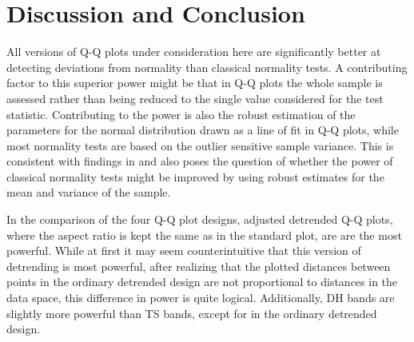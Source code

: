 \documentclass[12pt]{article}\usepackage[]{graphicx}\usepackage[]{color}
\begin{document}
\section{Discussion and Conclusion}\label{sec:discussion}

All versions of Q-Q plots under consideration here are significantly better at detecting deviations from normality than classical normality tests. A contributing factor to this superior power might be  that in  Q-Q plots the whole sample is assessed rather than being reduced to the single value considered for the test statistic. 
Contributing to the power is also the robust estimation of the parameters for the normal distribution drawn as a line of fit in  Q-Q plots, while most normality tests are based on the outlier sensitive sample variance. %
This is consistent with findings in \citet{buja:2013} and  also poses the question of whether the power of classical normality tests might  be improved by using robust estimates for the mean and variance of the sample. 

In the comparison of the four Q-Q plot designs, adjusted detrended Q-Q plots, where the aspect ratio is kept the same as in the standard plot, are are the most powerful. While at first it may seem counterintuitive that this version of detrending is most powerful, after realizing that the plotted distances between points in the ordinary detrended design are not proportional to distances in the data space, this difference in power is quite logical. Additionally, DH bands are slightly more powerful than TS bands, except for in the ordinary detrended design.
\end{document}

